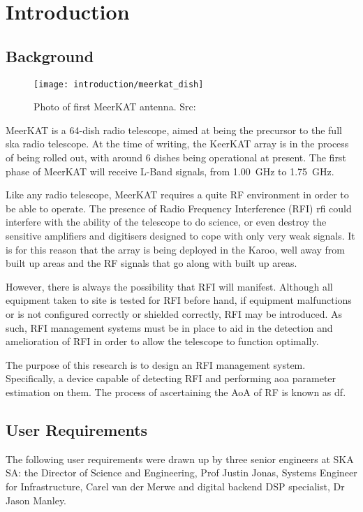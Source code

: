 \chapter{Introduction}
\section{Background}
\begin{wrapfigure}{r}{0.4\textwidth}
  \begin{center}
    \texttt{[image: introduction/meerkat\_dish]}
  \end{center}
  \caption{Photo of first MeerKAT antenna. Src: \cite{skasawebsite}}
\end{wrapfigure}
MeerKAT is a 64-dish radio telescope, aimed at being the precursor to the full \gls{ska} radio telescope. At the time of writing, the KeerKAT array is in the process of being rolled out, with around 6 dishes being operational at present.
The first phase of MeerKAT will receive L-Band signals, from \SI{1.00}{\giga\hertz} to \SI{1.75}{\giga\hertz}. 

Like any radio telescope, MeerKAT requires a quite RF environment in order to be able to operate. 
The presence of Radio Frequency Interference (RFI) \gls{rfi} could interfere with the ability of the telescope to do science, or even destroy the sensitive amplifiers and digitisers designed to cope with only very weak signals.
It is for this reason that the array is being deployed in the Karoo, well away from built up areas and the RF signals that go along with built up areas. 

However, there is always the possibility that RFI will manifest. 
Although all equipment taken to site is tested for RFI before hand, if equipment malfunctions or is not configured correctly or shielded correctly, RFI may be introduced.
As such, RFI management systems must be in place to aid in the detection and amelioration of RFI in order to allow the telescope to function optimally.

The purpose of this research is to design an RFI management system. 
Specifically, a device capable of detecting RFI and performing \gls{aoa} parameter estimation on them. 
The process of ascertaining the AoA of RF is known as \gls{df}.

\section{User Requirements}

The following user requirements were drawn up by three senior engineers at SKA SA: the Director of Science and Engineering, Prof Justin Jonas, Systems Engineer for Infrastructure, Carel van der Merwe and digital backend DSP specialist, Dr Jason Manley. 

